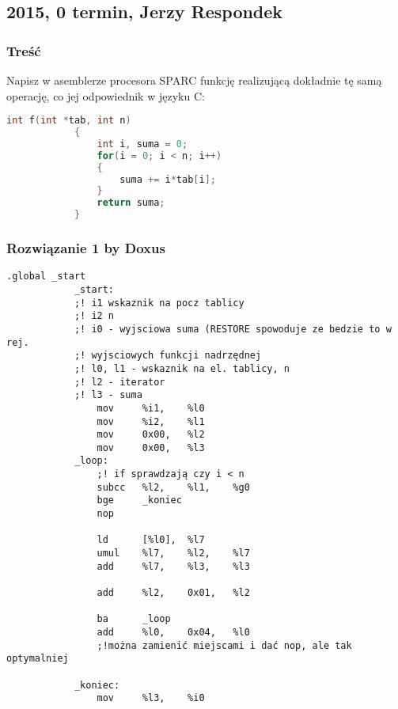 	\newpage
	\subsection{2015, 0 termin, Jerzy Respondek}
		\subsubsection{Treść}
			Napisz w asemblerze procesora SPARC funkcję realizującą dokładnie tę samą operację, co jej odpowiednik w języku C:
			\begin{lstlisting}[language=C]
			int f(int *tab, int n) 
			{
				int i, suma = 0;
				for(i = 0; i < n; i++)
				{
					suma += i*tab[i];
				}
				return suma;
			}
			\end{lstlisting}
		\subsubsection{Rozwiązanie 1 by Doxus}
			\begin{lstlisting}[language={[sparc]Assembler}]
			.global _start
			_start:
			;! i1 wskaznik na pocz tablicy
			;! i2 n
			;! i0 - wyjsciowa suma (RESTORE spowoduje ze bedzie to w rej.
			;! wyjsciowych funkcji nadrzędnej
			;! l0, l1 - wskaznik na el. tablicy, n
			;! l2 - iterator
			;! l3 - suma
				mov		%i1,	%l0			
				mov		%i2,	%l1			
				mov		0x00,	%l2
				mov		0x00,	%l3
			_loop:
				;! if sprawdzają czy i < n
				subcc	%l2,	%l1,	%g0
				bge		_koniec
				nop
			
				ld		[%l0],	%l7
				umul	%l7, 	%l2,	%l7
				add		%l7,	%l3, 	%l3
				
				add		%l2,	0x01,	%l2
				
				ba		_loop
				add		%l0,	0x04,	%l0
				;!można zamienić miejscami i dać nop, ale tak optymalniej
			
			_koniec:
				mov		%l3,	%i0
			\end{lstlisting}
		\newpage
